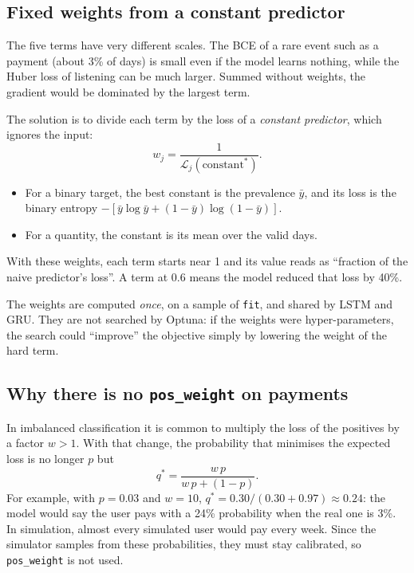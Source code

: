 \documentclass[11pt]{article}
\newcommand{\code}[1]{\texttt{#1}}
\begin{document}
\subsection{Fixed weights from a constant predictor}

The five terms have very different scales. The BCE of a rare event such as a payment (about 3\% of days) is small even if the model learns nothing, while the Huber loss of listening can be much larger. Summed without weights, the gradient would be dominated by the largest term.

The solution is to divide each term by the loss of a \emph{constant predictor}, which ignores the input:
\begin{equation}
w_j = \frac{1}{\mathcal L_j(\text{constant}^{*})} .
\end{equation}
\begin{itemize}
  \item For a binary target, the best constant is the prevalence $\bar y$, and its loss is the binary entropy $-[\bar y \log \bar y + (1-\bar y)\log(1-\bar y)]$.
  \item For a quantity, the constant is its mean over the valid days.
\end{itemize}
With these weights, each term starts near 1 and its value reads as ``fraction of the naive predictor's loss''. A term at $0.6$ means the model reduced that loss by 40\%.

The weights are computed \emph{once}, on a sample of \code{fit}, and shared by LSTM and GRU. They are not searched by Optuna: if the weights were hyper-parameters, the search could ``improve'' the objective simply by lowering the weight of the hard term.

\subsection{Why there is no \code{pos\_weight} on payments}

In imbalanced classification it is common to multiply the loss of the positives by a factor $w > 1$. With that change, the probability that minimises the expected loss is no longer $p$ but
\begin{equation}
q^{*} = \frac{w\,p}{w\,p + (1 - p)} .
\end{equation}
For example, with $p = 0.03$ and $w = 10$, $q^{*} = 0.30/(0.30 + 0.97) \approx 0.24$: the model would say the user pays with a 24\% probability when the real one is 3\%. In simulation, almost every simulated user would pay every week. Since the simulator samples from these probabilities, they must stay calibrated, so \code{pos\_weight} is not used.
\end{document}

